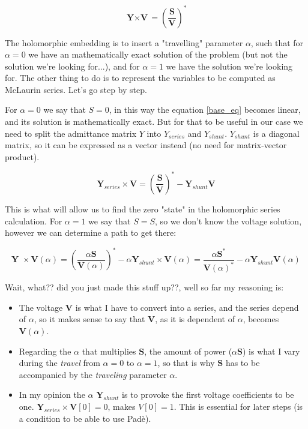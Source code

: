 \documentclass[a4paper,twoside,fleqn]{tufte-book}
\begin{document}
\begin{equation}
{\textbf{Y} \times \textbf{V}} = \left(\frac{\textbf{S}}{\textbf{V}}\right)^* 
\label{base_eq}
\end{equation}


The holomorphic embedding is to insert a "travelling" parameter $\alpha$, such that for $\alpha=0$ we have an mathematically exact solution of the problem (but not the solution we're looking for...), and for $\alpha=1$ we have the solution we're looking for. The other thing to do is to represent the variables to be computed as McLaurin series. Let's go step by step.\newline

For $\alpha=0$ we say that $S=0$, in this way the equation \ref{base_eq} becomes linear, and its solution is mathematically exact. But for that to be useful in our case we need to split the admittance matrix $Y$ into $Y_{series}$ and $Y_{shunt}$. $Y_{shunt}$ is a diagonal matrix, so it can be expressed as a vector instead (no need for matrix-vector product).

\begin{equation}
\textbf{Y}_{series} \times \textbf{V} = \left(\frac{\textbf{S}}{\textbf{V}}\right)^* - \textbf{Y}_{shunt} \textbf{V}
\label{base_eq_alpha_0}
\end{equation}

This is what will allow us to find the zero "state" in the holomorphic series calculation. For $\alpha=1$ we say that $S=S$, so we don't know the voltage solution, however we can determine a path to get there:

\begin{equation}
{\textbf{Y }\times \textbf{V}( \alpha )} = \left(\frac{ \alpha\textbf{S}}{\textbf{V}( \alpha )}\right)^* - \alpha \textbf{Y}_{shunt} \times \textbf{V}( \alpha ) = \frac{ \alpha\textbf{S}^*}{\textbf{V}( \alpha )^*} - \alpha \textbf{Y}_{shunt} \textbf{V}( \alpha )
\label{base_eq_embedded}
\end{equation}

Wait, what?? did you just made this stuff up??, well so far my reasoning is:
\begin{itemize}
	\item The voltage $\textbf{V}$ is what I have to convert into a series, and the series depend of $\alpha$, so it makes sense to say that $\textbf{V}$, as it is dependent of $\alpha$, becomes $\textbf{V}(\alpha)$.
	
	\item Regarding the $\alpha$ that multiplies $\textbf{S}$, the amount of power ($\alpha \textbf{S}$) is what I vary during the \textit{travel} from $\alpha=0$ to $\alpha=1$, so that is why $\textbf{S}$ has to be accompanied by the \textit{traveling} parameter $\alpha.$
	
	\item In my opinion the $\alpha$ $\textbf{Y}_{shunt}$ is to provoke the first voltage coefficients to be one.  $\textbf{Y}_{series} \times \textbf{V}[0] = 0$, makes $V[0]=1$. This is essential for later steps (is a condition to be able to use Padè). \newline
\end{itemize}
\end{document}
